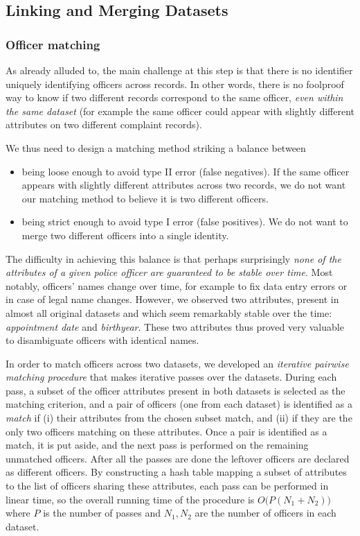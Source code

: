\subsection{Linking and Merging Datasets}\label{sec:linking}

\subsubsection{Officer matching}

As already alluded to, the main challenge at this step is that there is no
identifier uniquely identifying officers across records. In other words, there
is no foolproof way to know if two different records correspond to the same
officer, \emph{even within the same dataset} (for example the same officer
could appear with slightly different attributes on two different complaint
records).

We thus need to design a matching method striking a balance between
\begin{itemize}
	\item being loose enough to avoid type II error (false negatives). If the
		same officer appears with slightly different attributes across two
		records, we do not want our matching method to believe it is two
		different officers.
	\item being strict enough to avoid type I error (false positives). We do
		not want to merge two different officers into a single identity.
\end{itemize}

The difficulty in achieving this balance is that perhaps surprisingly
\emph{none of the attributes of a given police officer are guaranteed to be
stable over time}. Most notably, officers' names change over time, for example
to fix data entry errors or in case of legal name changes. However, we observed
two attributes, present in almost all original datasets and which seem
remarkably stable over the time: \emph{appointment date} and \emph{birthyear}.
These two attributes thus proved very valuable to disambiguate officers with
identical names.

In order to match officers across two datasets, we developed an \emph{iterative
pairwise matching procedure} that makes iterative passes over the datasets.
During each pass, a subset of the officer attributes present in both datasets
is selected as the matching criterion, and a pair of officers (one from each
dataset) is identified as a \emph{match} if (i) their attributes from the
chosen subset match, and (ii) if they are the only two officers matching on
these attributes. Once a pair is identified as a match, it is put aside, and
the next pass is performed on the remaining unmatched officers. After all the
passes are done the leftover officers are declared as different officers. By
constructing a hash table mapping a subset of attributes to the list of
officers sharing these attributes, each pass can be performed in linear time,
so the overall running time of the procedure is $O\big(P(N_1+N_2)\big)$ where
$P$ is the number of passes and $N_1, N_2$ are the number of officers in each
dataset.

